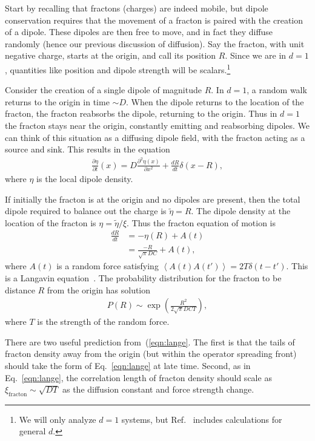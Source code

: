 \documentclass[a4paper,12pt]{article}
\newcommand{\pd}[2]{\frac{\partial #1}{\partial #2}}
\newcommand{\pdn}[3]{\frac{\partial^{#3} #1}{\partial #2^{#3}}}
\newcommand{\nd}[2]{\frac{d #1}{d #2}}
\newcommand{\ex}[1]{\left\langle #1 \right\rangle}
\newcommand{\note}[1]{{\color{red}{#1}}}
\begin{document}
Start by recalling that fractons (charges) are indeed mobile, but dipole conservation requires that the movement of a fracton is paired with the creation of a dipole. These dipoles are then free to move, and in fact they diffuse randomly (hence our previous discussion of diffusion). Say the fracton, with unit negative charge, starts at the origin, and call its position $R$. Since we are in $d=1$, quantities like position and dipole strength will be scalars.\footnote{We will only analyze $d=1$ systems, but Ref.~\cite{PaiFracton} includes calculations for general $d$.}

Consider the creation of a single dipole of magnitude $R$. In $d=1$, a random walk returns to the origin in time $\sim D$.  When the dipole returns to the location of the fracton, the fracton reabsorbs the dipole, returning to the origin. Thus in $d=1$ the fracton stays near the origin, constantly emitting and reabsorbing dipoles. We can think of this situation as a diffusing dipole field, with the fracton acting as a source and sink. This results in the equation
\begin{align}
\pd{\eta}{t}(x) = D\pdn{\eta(x)}{x}{2} + \nd{R}{t}\delta(x-R),
\end{align}
where $\eta$ is the local dipole density.

If initially the fracton is at the origin and no dipoles are present, then the total dipole required to balance out the charge is $\tilde{\eta}=R$. The dipole density at the location of the fracton is $\eta = \tilde{\eta}/\xi$. Thus the fracton equation of motion is
\begin{align}
\nd{R}{t} &= -\eta(R) + A(t)\\
&= \frac{-R}{\sqrt{\pi} DC}+ A(t),
\end{align}
where $A(t)$ is a random force satisfying $\ex{A(t)A(t')} = 2T\delta(t-t')$. \note{The units are very wonky here.} This is a Langavin equation~\cite{MarenduAsp}. The probability distribution for the fracton to be distance $R$ from the origin has solution
\begin{align}
P(R) \sim \exp\left(\frac{R^2}{2\sqrt{\pi}DCT}\right), \label{eqn:lange}
\end{align}
where $T$ is the strength of the random force. 

There are two useful prediction from~(\ref{eqn:lange}. The first is that the tails of fracton density away from the origin (but within the operator spreading front) should take the form of Eq.~\ref{eqn:lange} at late time. Second, as in Eq.~\ref{eqn:lange}, the correlation length of fracton density should scale as $\xi_\text{fracton}\sim \sqrt{DT}$ as the diffusion constant and force strength change. 
\end{document}
